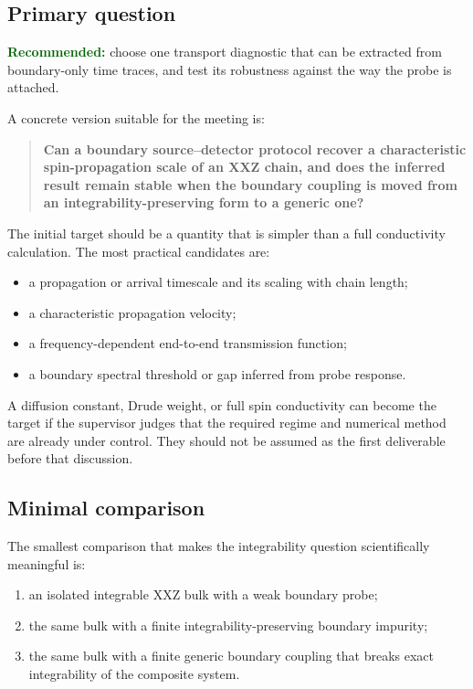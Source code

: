 \documentclass[11pt,a4paper]{article}
\newcommand{\recommend}[1]{\textcolor{darkgreen}{\textbf{#1}}}
\begin{document}
\subsection{Primary question}
\recommend{Recommended:} choose one transport diagnostic that can be extracted from boundary-only time traces, and test its robustness against the way the probe is attached.

A concrete version suitable for the meeting is:
\begin{quote}
\textbf{Can a boundary source--detector protocol recover a characteristic spin-propagation scale of an XXZ chain, and does the inferred result remain stable when the boundary coupling is moved from an integrability-preserving form to a generic one?}
\end{quote}

The initial target should be a quantity that is simpler than a full conductivity calculation.  The most practical candidates are:
\begin{itemize}[leftmargin=0.8cm]
    \item a propagation or arrival timescale and its scaling with chain length;
    \item a characteristic propagation velocity;
    \item a frequency-dependent end-to-end transmission function;
    \item a boundary spectral threshold or gap inferred from probe response.
\end{itemize}

A diffusion constant, Drude weight, or full spin conductivity can become the target if the supervisor judges that the required regime and numerical method are already under control.  They should not be assumed as the first deliverable before that discussion.

\subsection{Minimal comparison}
The smallest comparison that makes the integrability question scientifically meaningful is:
\begin{enumerate}[leftmargin=0.9cm]
    \item an isolated integrable XXZ bulk with a weak boundary probe;
    \item the same bulk with a finite integrability-preserving boundary impurity;
    \item the same bulk with a finite generic boundary coupling that breaks exact integrability of the composite system.
\end{enumerate}
\end{document}
